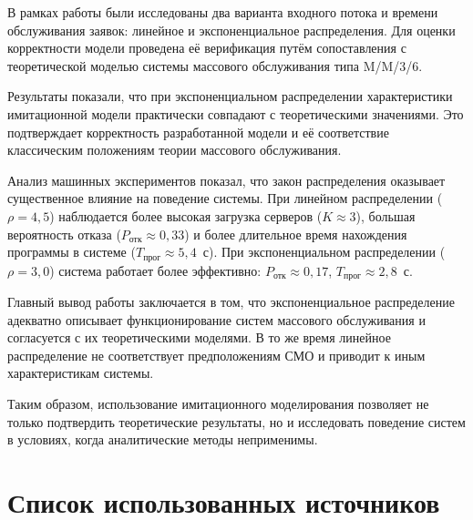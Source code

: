 \documentclass[14pt,a4paper]{extarticle}
\begin{document}
В рамках работы были исследованы два варианта входного потока и времени
обслуживания заявок: линейное и экспоненциальное распределения. Для оценки
корректности модели проведена её верификация путём сопоставления с теоретической
моделью системы массового обслуживания типа M/M/3/6.

Результаты показали, что при экспоненциальном распределении характеристики
имитационной модели практически совпадают с теоретическими значениями. Это
подтверждает корректность разработанной модели и её соответствие классическим
положениям теории массового обслуживания.

Анализ машинных экспериментов показал, что закон распределения оказывает
существенное влияние на поведение системы. При линейном распределении
($\rho = 4{,}5$) наблюдается более высокая загрузка серверов ($K \approx 3$),
большая вероятность отказа ($P_{\text{отк}} \approx 0{,}33$) и более длительное
время нахождения программы в системе ($T_{\text{прог}} \approx 5{,}4$~с).
При экспоненциальном распределении ($\rho = 3{,}0$) система работает более
эффективно: $P_{\text{отк}} \approx 0{,}17$, $T_{\text{прог}} \approx 2{,}8$~с.

Главный вывод работы заключается в том, что экспоненциальное распределение
адекватно описывает функционирование систем массового обслуживания и согласуется
с их теоретическими моделями. В то же время линейное распределение не
соответствует предположениям СМО и приводит к иным характеристикам системы.

Таким образом, использование имитационного моделирования позволяет не только
подтвердить теоретические результаты, но и исследовать поведение систем в
условиях, когда аналитические методы неприменимы.

\newpage
\section*{Список использованных источников}
\end{document}
